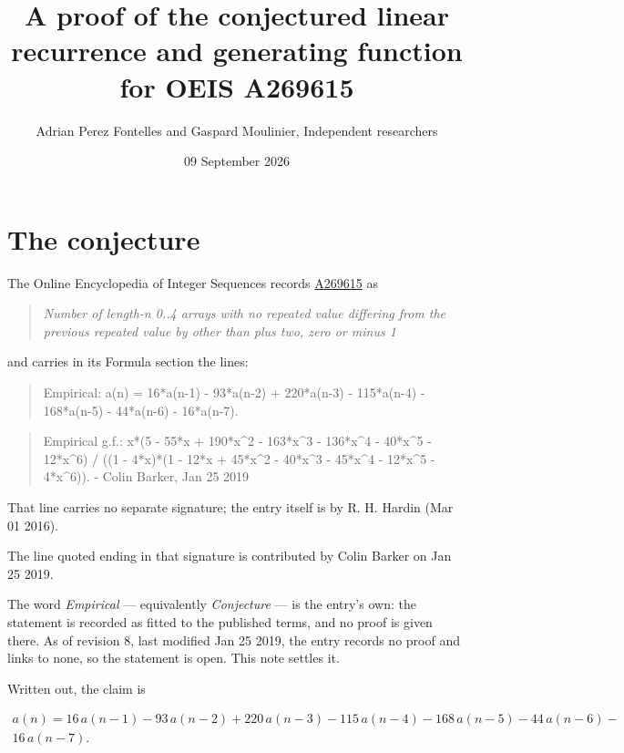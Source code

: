\documentclass[11pt]{article}
\title{A proof of the conjectured linear recurrence and generating function for OEIS A269615}
\author{Adrian Perez Fontelles and Gaspard Moulinier, Independent researchers}
\date{09 September 2026}
\theoremstyle{definition}
\begin{document}
\maketitle
\section{The conjecture}

The Online Encyclopedia of Integer Sequences records \href{https://oeis.org/A269615}{A269615} as

\begin{quote}\itshape Number of length-n 0..4 arrays with no repeated value differing from the previous repeated value by other than plus two, zero or minus 1\end{quote}

and carries in its Formula section the lines:

\begin{quote}\ttfamily Empirical: a(n) = 16*a(n-1) - 93*a(n-2) + 220*a(n-3) - 115*a(n-4) - 168*a(n-5) - 44*a(n-6) - 16*a(n-7).\end{quote}

\begin{quote}\ttfamily Empirical g.f.: x*(5 - 55*x + 190*x\textasciicircum{}2 - 163*x\textasciicircum{}3 - 136*x\textasciicircum{}4 - 40*x\textasciicircum{}5 - 12*x\textasciicircum{}6) / ((1 - 4*x)*(1 - 12*x + 45*x\textasciicircum{}2 - 40*x\textasciicircum{}3 - 45*x\textasciicircum{}4 - 12*x\textasciicircum{}5 - 4*x\textasciicircum{}6)). - Colin Barker, Jan 25 2019\end{quote}

That line carries no separate signature; the entry itself is by R. H. Hardin (Mar 01 2016).

The line quoted ending in that signature is contributed by Colin Barker on Jan 25 2019.

The word {\itshape Empirical} --- equivalently {\itshape Conjecture} --- is the entry's own: the statement is recorded as fitted to the published terms, and no proof is given there. As of revision 8, last modified Jan 25 2019, the entry records no proof and links to none, so the statement is open. This note settles it.

Written out, the claim is

\begin{multline*} a(n) = 16\,a(n-1) - 93\,a(n-2) + 220\,a(n-3) - 115\,a(n-4) - 168\,a(n-5) - 44\,a(n-6) - \\ 16\,a(n-7). \end{multline*}
\end{document}
